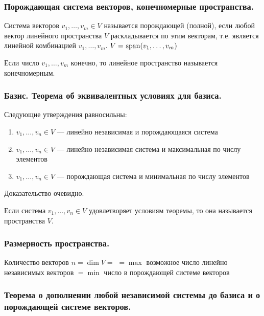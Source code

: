\subsubsection{Порождающая система векторов, конечномерные пространства.}

Система векторов \(v_1, \ldots, v_m \in V\) называется порождающей (полной), если любой вектор линейного пространства \(V\) раскладывается по этим векторам, т.е. является линейной комбинацией \(v_1, \ldots, v_m\). \(V = \spann (v_1, \ldots, v_m)\)

Если число \(v_1, \ldots, v_m\) конечно, то линейное пространство называется конечномерным.

\subsubsection{Базис. Теорема об эквивалентных условиях для базиса.}


Следующие утверждения равносильны:

\begin{enumerate}
    \item \(v_1, \ldots, v_n \in V\) --- линейно независимая и порождающаяся система

    \item \(v_1, \ldots, v_n \in V\) --- линейно независимая система и максимальная по числу элементов

    \item \(v_1, \ldots, v_n \in V\) --- порождающая система и минимальная по числу элементов
\end{enumerate}
 Доказательство очевидно.
 
 Если система \(v_1, \ldots, v_n \in V\) удовлетворяет условиям теоремы, то она называется  пространства \(V\).

\subsubsection{Размерность пространства.}
 Количество векторов \(n = \dim V = \)  \(= \max\) возможное число линейно независимых векторов \(= \min\) число в порождающей системе векторов

 \subsubsection{Теорема о дополнении любой независимой системы до базиса и о порождающей системе векторов.}
 


